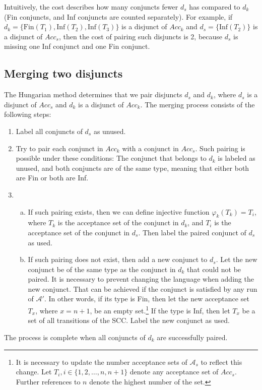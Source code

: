 \documentclass[
  digital, %
  twoside, %
  table,   %
  lof,     %
  lot,     %
]{fithesis3}
\begin{document}
Intuitively, the cost describes how many conjuncts fewer $d_s$ has compared to $d_k$ (Fin conjuncts, and Inf conjuncts are counted separately). For example, if $d_k = \{\text{Fin}(T_1), \text{Inf}(T_2), \text{Inf}(T_3)\}$ is a disjunct of $Acc_k$ and $d_s = \{\text{Inf}(T_2)\}$ is a disjunct of $Acc_s$, then the cost of pairing such disjuncts is 2, because $d_s$ is missing one Inf conjunct and one Fin conjunct. 

\subsection{Merging two disjuncts}
The Hungarian method determines that we pair disjuncts $d_s$ and $d_k$, where $d_s$ is a disjunct of $Acc_s$ and $d_k$ is a disjunct of $Acc_k$. The merging process consists of the following steps:
\begin{enumerate}
  \item Label all conjuncts of $d_s$ as unused.
  \item Try to pair each conjunct in $Acc_k$ with a conjunct in $Acc_s$. Such pairing is possible under these conditions: The conjunct that belongs to $d_k$ is labeled as unused, and both conjuncts are of the same type, meaning that either both are Fin or both are Inf.
  \item \begin{enumerate}[a)]
    \item If such pairing exists, then we can define injective function $\varphi_k (T_k) = T_i$, where $T_k$ is the acceptance set of the conjunct in $d_k$, and $T_i$ is the acceptance set of the conjunct in $d_s$. Then label the paired conjunct of $d_s$ as used.
    \item If such pairing does not exist, then add a new conjunct to $d_s$. Let the new conjunct be of the same type as the conjunct in $d_k$ that could not be paired. It is necessary to prevent changing the language when adding the new conjunct. That can be achieved if the conjunct is satisfied by any run of $\mathcal{A'}$. In other words, if its type is Fin, then let the new acceptance set $T_x$, where $x = n + 1$, be an empty set.\footnote{It is necessary to update the number acceptance sets of $\mathcal{A}_s$ to reflect this change. Let $T_i, i \in \{1,2, \dots, n, n+1\}$ denote any acceptance set of $Acc_s$. Further references to $n$ denote the highest number of the set.} If the type is Inf, then let $T_x$ be a set of all transitions of the SCC. Label the new conjunct as used.
  \end{enumerate}
\end{enumerate}
The process is complete when all conjuncts of $d_k$ are successfully paired.
\end{document}
